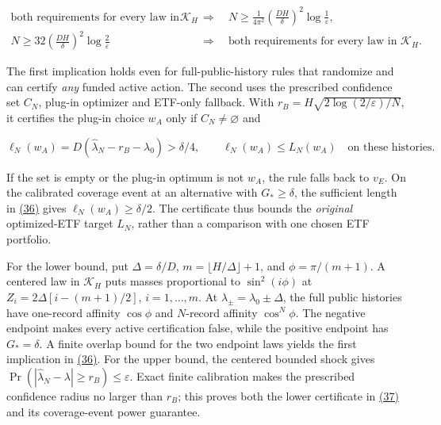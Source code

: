 \documentclass[11pt]{article}
\begin{document}
\begin{equation*}
\begin{aligned}
\text{both requirements for every law in }\mathcal K_H
&\quad\Longrightarrow\quad
N\geq\frac{1}{4\pi^2}
       \left(\frac{DH}{\delta}\right)^2
       \log\frac1\varepsilon,\\
N\geq32\left(\frac{DH}{\delta}\right)^2
       \log\frac2\varepsilon
&\quad\Longrightarrow\quad
\text{both requirements for every law in }\mathcal K_H.
\end{aligned}\tag{36}\label{eq:36}
\end{equation*}

The first implication holds even for full-public-history rules
that randomize and can certify \emph{any} funded active action. The
second uses the prescribed confidence set \(C_N\), plug-in
optimizer and ETF-only fallback. With
\(r_B=H\sqrt{2\log(2/\varepsilon)/N}\), it certifies the
plug-in choice \(w_A\) only if \(C_N\ne\varnothing\) and

\begin{equation*}
\ell_N(w_A)=D(\widehat\lambda_N-r_B-\lambda_0)
 >\delta/4,\qquad
\ell_N(w_A)\leq L_N(w_A)
 \quad\text{on these histories}.
\tag{37}\label{eq:37}
\end{equation*}

If the set is empty or the plug-in optimum is not \(w_A\),
the rule falls back to \(v_E\). On the calibrated coverage
event at an alternative with \(G_*\geq\delta\), the
sufficient length in \hyperref[eq:36]{(36)} gives \(\ell_N(w_A)\geq\delta/2\).
The certificate thus bounds the \emph{original} optimized-ETF
target \(L_N\), rather than a comparison with one chosen ETF
portfolio.

For the lower bound, put \(\Delta=\delta/D\),
\(m=\lfloor H/\Delta\rfloor+1\), and
\(\phi=\pi/(m+1)\). A centered law in \(\mathcal K_H\)
puts masses proportional to \(\sin^2(i\phi)\) at
\(Z_i=2\Delta[i-(m+1)/2]\), \(i=1,\ldots,m\). At
\(\lambda_\pm=\lambda_0\pm\Delta\), the full public
histories have one-record affinity \(\cos\phi\) and
\(N\)-record affinity \(\cos^N\phi\). The negative endpoint
makes every active certification false, while the positive
endpoint has \(G_*=\delta\). A finite overlap bound for
the two endpoint laws yields the first implication in \hyperref[eq:36]{(36)}.
For the upper bound, the centered bounded shock gives
\(\Pr(|\widehat\lambda_N-\lambda|\geq r_B)\leq\varepsilon\).
Exact finite calibration makes the prescribed confidence
radius no larger than \(r_B\); this proves both the lower
certificate in \hyperref[eq:37]{(37)} and its coverage-event power guarantee.
\end{document}
